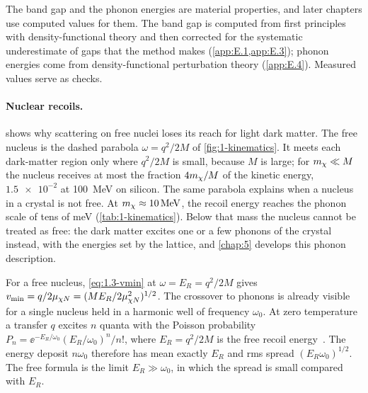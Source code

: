 The band gap and the phonon energies are material properties, and later chapters use computed values for them. The band gap is computed from first principles with density-functional theory and then corrected for the systematic underestimate of gaps that the method makes (\cref{app:E.1,app:E.3}); phonon energies come from density-functional perturbation theory (\cref{app:E.4}). Measured values serve as checks.

\paragraph{Nuclear recoils.}  shows why scattering on free nuclei loses its reach for light dark matter. The free nucleus is the dashed parabola $\omega = q^2/2M$ of \cref{fig:1-kinematics}. It meets each dark-matter region only where $q^2/2M$ is small, because $M$ is large; for $m_{\chi} \ll M$ the nucleus receives at most the fraction $4m_{\chi}/M$ of the kinetic energy, $\num{1.5e-2}$ at \SI{100}{MeV} on silicon. The same parabola explains when a nucleus in a crystal is not free. At $m_{\chi} \approx \SI{10}{MeV}$, the recoil energy reaches the phonon scale of tens of meV (\cref{tab:1-kinematics}). Below that mass the nucleus cannot be treated as free: the dark matter excites one or a few phonons of the crystal instead, with the energies set by the lattice, and \cref{chap:5} develops this phonon description.

For a free nucleus, \cref{eq:1.3-vmin} at $\omega = E_R = q^2/2M$ gives $v_{\mathrm{min}} = q/2\mu_{\chi N} = (ME_R/2\mu_{\chi N}^2)^{1/2}$. The crossover to phonons is already visible for a single nucleus held in a harmonic well of frequency $\omega_0$. At zero temperature a transfer $q$ excites $n$ quanta with the Poisson probability $P_n = \ee^{-E_R/\omega_0}(E_R/\omega_0)^n/n!$, where $E_R = q^2/2M$ is the free recoil energy~\cite[Eqs.~(90) and (91)]{kahn2022searches}. The energy deposit $n\omega_0$ therefore has mean exactly $E_R$ and rms spread $(E_R\omega_0)^{1/2}$. The free formula is the limit $E_R \gg \omega_0$, in which the spread is small compared with $E_R$.

